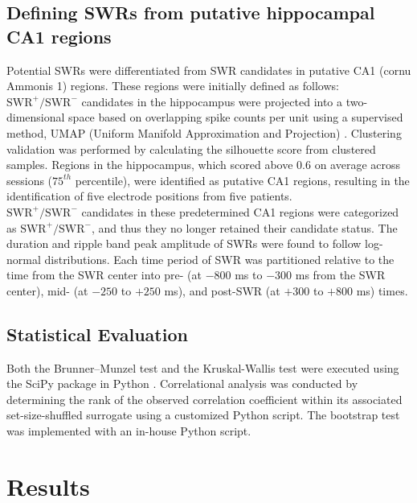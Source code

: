\documentclass[preprint,review,12pt]{elsarticle}%
\begin{document}
\subsection{Defining SWRs from putative hippocampal CA1 regions}
Potential SWRs were differentiated from SWR candidates in putative CA1 (cornu Ammonis 1) regions. These regions were initially defined as follows: $\textrm{SWR}^+/\textrm{SWR}^-$ candidates in the hippocampus were projected into a two-dimensional space based on overlapping spike counts per unit using a supervised method, UMAP (Uniform Manifold Approximation and Projection) \cite{mcinnes_umap_2018}. Clustering validation was performed by calculating the silhouette score \cite{rousseeuw_silhouettes_1987} from clustered samples. Regions in the hippocampus, which scored above 0.6 on average across sessions ($75^{th}$ percentile), were identified as putative CA1 regions, resulting in the identification of five electrode positions from five patients.
\\
\indent
$\textrm{SWR}^+/\textrm{SWR}^-$ candidates in these predetermined CA1 regions were categorized as $\textrm{SWR}^+/\textrm{SWR}^-$, and thus they no longer retained their candidate status. The duration and ripple band peak amplitude of SWRs were found to follow log-normal distributions. Each time period of SWR was partitioned relative to the time from the SWR center into pre- (at $-800$ ms to $-300$ ms from the SWR center), mid- (at $-250$ to $+250$ ms), and post-SWR (at $+300$ to $+800$ ms) times.
\\
\indent
\subsection{Statistical Evaluation}
Both the Brunner--Munzel test and the Kruskal-Wallis test were executed using the SciPy package in Python \cite{virtanen_scipy_2020}. Correlational analysis was conducted by determining the rank of the observed correlation coefficient within its associated set-size-shuffled surrogate using a customized Python script. The bootstrap test was implemented with an in-house Python script.
\label{sec:methods}
\section{Results}
\end{document}
